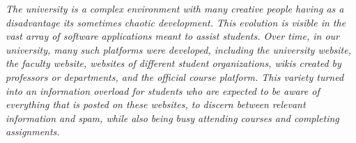 \vspace*{\fill}
\noindent






\textit{The university is a complex environment with many creative people having as a disadvantage its sometimes chaotic development. This evolution is visible in the vast array of software applications meant to assist students. Over time, in our university, many such platforms were developed, including the university website, the faculty website, websites of different student organizations, wikis created by professors or departments, and the official course platform. This variety turned into an information overload for students who are expected to be aware of everything that is posted on these websites, to discern between relevant information and spam, while also being busy attending courses and completing assignments.}

